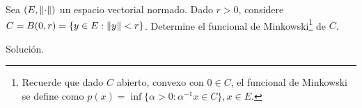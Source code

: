 \begin{homeworkProblem}
  Sea $(E,\left\|\cdot\right\|)$ un espacio vectorial normado. Dado $r>0$, considere $C=B(0,r)=\{y\in E:\left\|y\right\|<r\}$. Determine el funcional de Minkowski\footnote{Recuerde que dado $C$ abierto, convexo con $0\in C$, el funcional de Minkowski se define como $p(x)=\inf\{\alpha>0: \alpha^{-1}x\in C\},x\in E$.} de $C$.
  \begin{solution}
    Solución.
  \end{solution}
\end{homeworkProblem}
